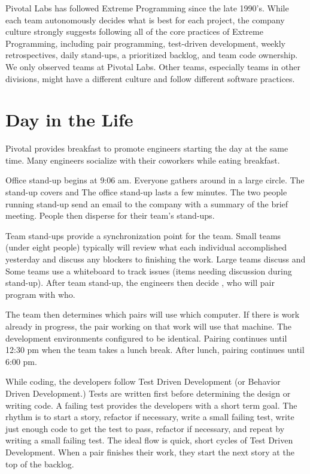 Pivotal Labs has followed Extreme Programming \cite{BeckExtremeProgramming2004} since the late 1990's. While each team autonomously decides what is best for each project, the company culture strongly suggests following all of the core practices of Extreme Programming, including pair programming, test-driven development, weekly retrospectives, daily stand-ups, a prioritized backlog, and team code ownership. We only observed teams at Pivotal Labs. Other teams, especially teams in other divisions, might have a different culture and follow different software practices.


\section{Day in the Life}
Pivotal provides breakfast to promote engineers starting the day at the same time. Many engineers socialize with their coworkers while eating breakfast. 


Office stand-up begins at 9:06 am. Everyone gathers around in a large circle. The stand-up covers    and  The office stand-up lasts a few minutes. The two people running stand-up send an email to the company with a summary of the brief meeting. People then disperse for their team's stand-ups.


Team stand-ups provide a synchronization point for the team. Small teams (under eight people) typically will review what each individual accomplished yesterday and discuss any blockers to finishing the work. Large teams discuss  and  Some teams use a whiteboard to track  issues (items needing discussion during stand-up). After team stand-up, the engineers then decide , who will pair program with who. 


The team then determines which pairs will use which computer. If there is work already in progress, the pair working on that work will use that machine. The development environments configured to be identical. Pairing continues until 12:30 pm when the team takes a lunch break. After lunch, pairing continues until 6:00 pm. 


While coding, the developers follow Test Driven Development (or Behavior Driven Development.) Tests are written first before determining the design or writing code. A failing test provides the developers with a short term goal. The rhythm is to start a story, refactor if necessary, write a small failing test, write just enough code to get the test to pass, refactor if necessary, and repeat by writing a small failing test. The ideal flow is quick, short cycles of Test Driven Development. When a pair finishes their work, they start the next story at the top of the backlog. 


